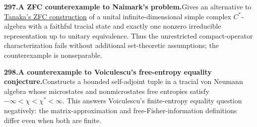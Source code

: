 \documentclass[11pt,a4paper]{article}
\begin{document}
  \par \begin{minipage}{\linewidth}
  \fontsize{10.5}{12.6}\selectfont\RaggedRight
  \hypertarget{result 297}{}
  {\bfseries\textcolor{muted}{297.}\enspace A ZFC counterexample to Naimark's problem.}\enspace Gives an alternative to \href{https://arxiv.org/abs/2609.26930v1}{Tanaka's ZFC construction} of a unital infinite-dimensional simple complex $C^*$-algebra with a faithful tracial state and exactly one nonzero irreducible representation up to unitary equivalence. Thus the unrestricted compact-operator characterization fails without additional set-theoretic assumptions; the counterexample is nonseparable.\par
  \end{minipage}\par\vspace{5pt}



  \par \begin{minipage}{\linewidth}
  \fontsize{10.5}{12.6}\selectfont\RaggedRight
  \hypertarget{result 298}{}
  {\bfseries\textcolor{muted}{298.}\enspace A counterexample to Voiculescu’s free-entropy equality conjecture.}\enspace Constructs a bounded self-adjoint tuple in a tracial von Neumann algebra whose microstates and nonmicrostates free entropies satisfy $-\infty<\chi<\chi^*<\infty$. This answers Voiculescu’s finite-entropy equality question negatively: the matrix-approximation and free-Fisher-information definitions differ even when both are finite.\par
  \end{minipage}\par\vspace{5pt}
\end{document}
